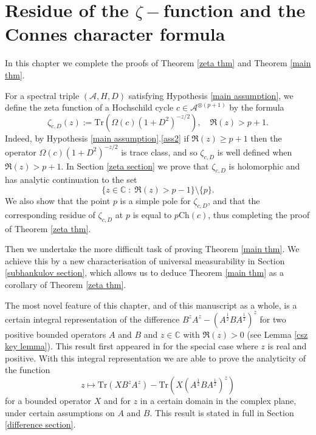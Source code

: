 \chapter{Residue of the $\zeta-$function and the Connes character formula}\label{zeta chapter}
    In this chapter we complete the proofs of Theorem \ref{zeta thm} and Theorem \ref{main thm}. 
    
    For a spectral triple $(\mathcal{A},H,D)$ satisfying Hypothesis \ref{main assumption}, we define the zeta function of a Hochschild cycle $c \in \mathcal{A}^{\otimes (p+1)}$ by the formula
    \begin{equation*}
        \zeta_{c,D}(z) := \mathrm{Tr}(\Omega(c)(1+D^2)^{-z/2}),\quad \Re(z) > p+1.
    \end{equation*}
    Indeed, by Hypothesis \ref{main assumption}.\eqref{ass2} if $\Re(z) \geq p+1$ then the operator $\Omega(c)(1+D^2)^{-z/2}$ is trace class, and so $\zeta_{c,D}$
    is well defined when $\Re(z) > p+1$. In Section \ref{zeta section} we prove that $\zeta_{c,D}$ is holomorphic and has analytic continuation to the set
    \begin{equation*}
        \{z \in \mathbb{C}\;:\; \Re(z) > p-1\}\setminus \{p\}.
    \end{equation*}
    We also show that the point $p$ is a simple pole for $\zeta_{c,D}$, and that the corresponding residue of $\zeta_{c,D}$ at $p$ is equal to $p\mathrm{Ch}(c)$, thus completing the proof
    of Theorem \ref{zeta thm}.
    
    Then we undertake the more difficult task of proving Theorem \ref{main thm}. We achieve this by a new characterisation
    of universal measurability in Section \ref{subhankulov section}, which allows us to deduce Theorem \ref{main thm} as a corollary of Theorem \ref{zeta thm}.
    
    The most novel feature of this chapter, and of this manuscript as a whole, is a certain integral representation
    of the difference $B^zA^z-(A^{\frac{1}{2}}BA^{\frac{1}{2}})^z$ for two positive bounded operators $A$ and $B$
    and $z \in \mathbb{C}$ with $\Re(z) > 0$ (see Lemma \ref{csz key lemma}). This result first appeared in \cite[Lemma 5.2]{CSZ} {for the special case where $z$ is real and positive. }
    With this integral representation we are able to prove the analyticity
    of the function
    \begin{equation*}
        z \mapsto \mathrm{Tr}(XB^zA^z)-\mathrm{Tr}(X(A^{\frac{1}{2}}BA^{\frac{1}{2}})^z)
    \end{equation*}
    for a bounded operator $X$ and for $z$ in a certain domain in the complex plane, under certain assumptions on $A$ and $B$. This result is
    stated in full in Section \ref{difference section}.
    
